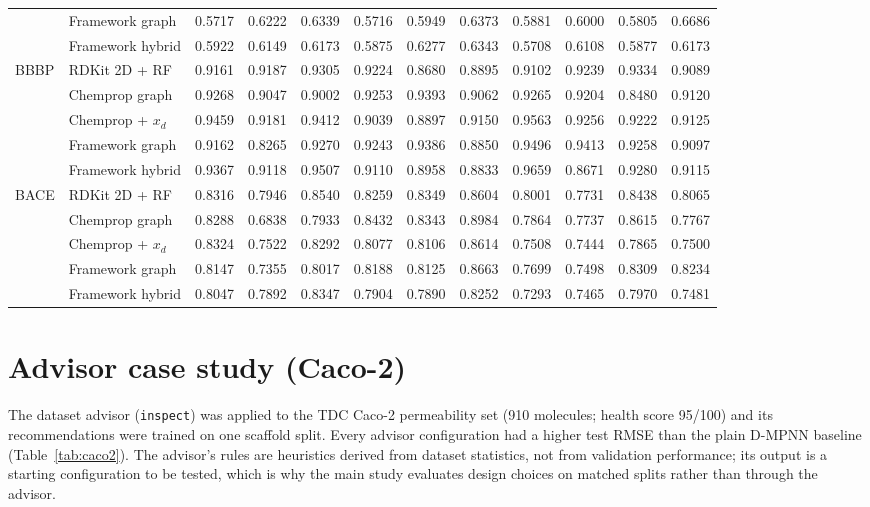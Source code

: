 \documentclass[10pt,a4paper]{article}
\newcommand{\cfg}[1]{\texttt{#1}}
\begin{document}
\begin{table}[H]
\begin{tabular}{@{}llcccccccccc@{}}
 & Framework graph & 0.5717 & 0.6222 & 0.6339 & 0.5716 & 0.5949 & 0.6373 & 0.5881 & 0.6000 & 0.5805 & 0.6686 \\
 & Framework hybrid & 0.5922 & 0.6149 & 0.6173 & 0.5875 & 0.6277 & 0.6343 & 0.5708 & 0.6108 & 0.5877 & 0.6173 \\
\midrule
BBBP & RDKit 2D + RF & 0.9161 & 0.9187 & 0.9305 & 0.9224 & 0.8680 & 0.8895 & 0.9102 & 0.9239 & 0.9334 & 0.9089 \\
 & Chemprop graph & 0.9268 & 0.9047 & 0.9002 & 0.9253 & 0.9393 & 0.9062 & 0.9265 & 0.9204 & 0.8480 & 0.9120 \\
 & Chemprop + $x_d$ & 0.9459 & 0.9181 & 0.9412 & 0.9039 & 0.8897 & 0.9150 & 0.9563 & 0.9256 & 0.9222 & 0.9125 \\
 & Framework graph & 0.9162 & 0.8265 & 0.9270 & 0.9243 & 0.9386 & 0.8850 & 0.9496 & 0.9413 & 0.9258 & 0.9097 \\
 & Framework hybrid & 0.9367 & 0.9118 & 0.9507 & 0.9110 & 0.8958 & 0.8833 & 0.9659 & 0.8671 & 0.9280 & 0.9115 \\
\midrule
BACE & RDKit 2D + RF & 0.8316 & 0.7946 & 0.8540 & 0.8259 & 0.8349 & 0.8604 & 0.8001 & 0.7731 & 0.8438 & 0.8065 \\
 & Chemprop graph & 0.8288 & 0.6838 & 0.7933 & 0.8432 & 0.8343 & 0.8984 & 0.7864 & 0.7737 & 0.8615 & 0.7767 \\
 & Chemprop + $x_d$ & 0.8324 & 0.7522 & 0.8292 & 0.8077 & 0.8106 & 0.8614 & 0.7508 & 0.7444 & 0.7865 & 0.7500 \\
 & Framework graph & 0.8147 & 0.7355 & 0.8017 & 0.8188 & 0.8125 & 0.8663 & 0.7699 & 0.7498 & 0.8309 & 0.8234 \\
 & Framework hybrid & 0.8047 & 0.7892 & 0.8347 & 0.7904 & 0.7890 & 0.8252 & 0.7293 & 0.7465 & 0.7970 & 0.7481 \\
\bottomrule
\end{tabular}
\end{table}

\section*{Advisor case study (Caco-2)}

The dataset advisor (\cfg{inspect}) was applied to the TDC Caco-2 permeability set (910 molecules; health score 95/100) and its recommendations were trained on one scaffold split. Every advisor configuration had a higher test RMSE than the plain D-MPNN baseline (Table~\ref{tab:caco2}). The advisor's rules are heuristics derived from dataset statistics, not from validation performance; its output is a starting configuration to be tested, which is why the main study evaluates design choices on matched splits rather than through the advisor.
\end{document}
